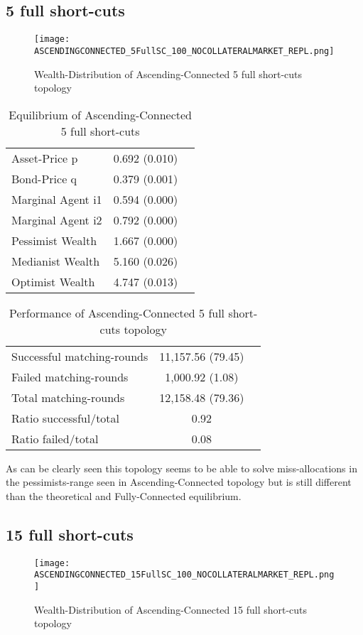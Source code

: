 \documentclass[Bachelorarbeit.tex]{subfiles}
\begin{document}
\subsection{5 full short-cuts}
\begin{figure}[H]
	\centering
  \texttt{[image: ASCENDINGCONNECTED\_5FullSC\_100\_NOCOLLATERALMARKET\_REPL.png]}
	\caption{Wealth-Distribution of Ascending-Connected 5 full short-cuts topology}
	\label{fig:wealth_ASCENDINGCONNECTED_5FullSC_100_NOCOLLATERALMARKET_REPL}
\end{figure}

\begin{table}[H]
	\caption{Equilibrium of Ascending-Connected 5 full short-cuts}
	\centering
	\begin{tabular} { l c r }
		\hline
		Asset-Price p & 0.692 (0.010) \\
		Bond-Price q & 0.379 (0.001) \\
		Marginal Agent i1 & 0.594 (0.000) \\
		Marginal Agent i2 & 0.792 (0.000) \\
		\hline
		Pessimist Wealth & 1.667 (0.000) \\
		Medianist Wealth & 5.160 (0.026) \\
		Optimist Wealth & 4.747 (0.013) \\
		\hline
	\end{tabular}
\end{table} 

\begin{table}[H]
	\caption{Performance of Ascending-Connected 5 full short-cuts topology}
	\centering
	\begin{tabular} { l c r }
		\hline
		Successful matching-rounds & 11,157.56 (79.45) \\
		Failed matching-rounds & 1,000.92 (1.08) \\
		Total matching-rounds & 12,158.48 (79.36) \\
		\hline
		Ratio successful/total & 0.92 \\
		Ratio failed/total & 0.08 \\
		\hline
	\end{tabular}
\end{table}

As can be clearly seen this topology seems to be able to solve miss-allocations in the pessimists-range seen in Ascending-Connected topology but is still different than the theoretical and Fully-Connected equilibrium.

\subsection{15 full short-cuts}
\begin{figure}[H]
	\centering
  \texttt{[image: ASCENDINGCONNECTED\_15FullSC\_100\_NOCOLLATERALMARKET\_REPL.png]}
	\caption{Wealth-Distribution of Ascending-Connected 15 full short-cuts topology}
	\label{fig:wealth_ASCENDINGCONNECTED_15FullSC_100_NOCOLLATERALMARKET_REPL}
\end{figure}
\end{document}
